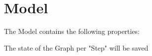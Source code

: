 \section{Model}
The Model contains the following properties:
\begin{list}{-}{}
\item The state of the Graph per "Step" will be saved

\end{list}


